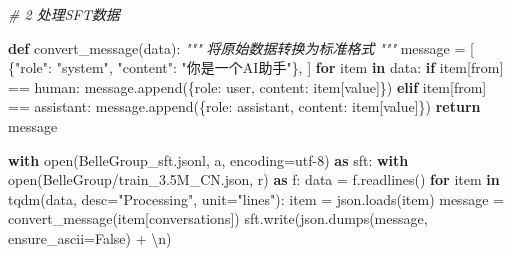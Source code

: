 \documentclass[
]{article}
\newenvironment{Shaded}{}{}
\newcommand{\BuiltInTok}[1]{\textcolor[rgb]{0.00,0.50,0.00}{#1}}
\newcommand{\CharTok}[1]{\textcolor[rgb]{0.25,0.44,0.63}{#1}}
\newcommand{\CommentTok}[1]{\textcolor[rgb]{0.38,0.63,0.69}{\textit{#1}}}
\newcommand{\ControlFlowTok}[1]{\textcolor[rgb]{0.00,0.44,0.13}{\textbf{#1}}}
\newcommand{\ImportTok}[1]{\textcolor[rgb]{0.00,0.50,0.00}{\textbf{#1}}}
\newcommand{\KeywordTok}[1]{\textcolor[rgb]{0.00,0.44,0.13}{\textbf{#1}}}
\newcommand{\NormalTok}[1]{#1}
\newcommand{\OperatorTok}[1]{\textcolor[rgb]{0.40,0.40,0.40}{#1}}
\newcommand{\StringTok}[1]{\textcolor[rgb]{0.25,0.44,0.63}{#1}}
\newcommand{\VariableTok}[1]{\textcolor[rgb]{0.10,0.09,0.49}{#1}}
\begin{document}
\begin{Shaded}
\begin{Highlighting}[]
\CommentTok{\# 2 处理SFT数据}

\KeywordTok{def}\NormalTok{ convert\_message(data):}
    \CommentTok{"""}
\CommentTok{    将原始数据转换为标准格式}
\CommentTok{    """}
\NormalTok{    message }\OperatorTok{=}\NormalTok{ [}
\NormalTok{        \{}\StringTok{"role"}\NormalTok{: }\StringTok{"system"}\NormalTok{, }\StringTok{"content"}\NormalTok{: }\StringTok{"你是一个AI助手"}\NormalTok{\},}
\NormalTok{    ]}
    \ControlFlowTok{for}\NormalTok{ item }\KeywordTok{in}\NormalTok{ data:}
        \ControlFlowTok{if}\NormalTok{ item[}\StringTok{\textquotesingle{}from\textquotesingle{}}\NormalTok{] }\OperatorTok{==} \StringTok{\textquotesingle{}human\textquotesingle{}}\NormalTok{:}
\NormalTok{            message.append(\{}\StringTok{\textquotesingle{}role\textquotesingle{}}\NormalTok{: }\StringTok{\textquotesingle{}user\textquotesingle{}}\NormalTok{, }\StringTok{\textquotesingle{}content\textquotesingle{}}\NormalTok{: item[}\StringTok{\textquotesingle{}value\textquotesingle{}}\NormalTok{]\})}
        \ControlFlowTok{elif}\NormalTok{ item[}\StringTok{\textquotesingle{}from\textquotesingle{}}\NormalTok{] }\OperatorTok{==} \StringTok{\textquotesingle{}assistant\textquotesingle{}}\NormalTok{:}
\NormalTok{            message.append(\{}\StringTok{\textquotesingle{}role\textquotesingle{}}\NormalTok{: }\StringTok{\textquotesingle{}assistant\textquotesingle{}}\NormalTok{, }\StringTok{\textquotesingle{}content\textquotesingle{}}\NormalTok{: item[}\StringTok{\textquotesingle{}value\textquotesingle{}}\NormalTok{]\})}
    \ControlFlowTok{return}\NormalTok{ message}

\ControlFlowTok{with} \BuiltInTok{open}\NormalTok{(}\StringTok{\textquotesingle{}BelleGroup\_sft.jsonl\textquotesingle{}}\NormalTok{, }\StringTok{\textquotesingle{}a\textquotesingle{}}\NormalTok{, encoding}\OperatorTok{=}\StringTok{\textquotesingle{}utf{-}8\textquotesingle{}}\NormalTok{) }\ImportTok{as}\NormalTok{ sft:}
    \ControlFlowTok{with} \BuiltInTok{open}\NormalTok{(}\StringTok{\textquotesingle{}BelleGroup/train\_3.5M\_CN.json\textquotesingle{}}\NormalTok{, }\StringTok{\textquotesingle{}r\textquotesingle{}}\NormalTok{) }\ImportTok{as}\NormalTok{ f:}
\NormalTok{        data }\OperatorTok{=}\NormalTok{ f.readlines()}
        \ControlFlowTok{for}\NormalTok{ item }\KeywordTok{in}\NormalTok{ tqdm(data, desc}\OperatorTok{=}\StringTok{"Processing"}\NormalTok{, unit}\OperatorTok{=}\StringTok{"lines"}\NormalTok{):}
\NormalTok{            item }\OperatorTok{=}\NormalTok{ json.loads(item)}
\NormalTok{            message }\OperatorTok{=}\NormalTok{ convert\_message(item[}\StringTok{\textquotesingle{}conversations\textquotesingle{}}\NormalTok{])}
\NormalTok{            sft.write(json.dumps(message, ensure\_ascii}\OperatorTok{=}\VariableTok{False}\NormalTok{) }\OperatorTok{+} \StringTok{\textquotesingle{}}\CharTok{\textbackslash{}n}\StringTok{\textquotesingle{}}\NormalTok{)}
\end{Highlighting}
\end{Shaded}
\end{document}
